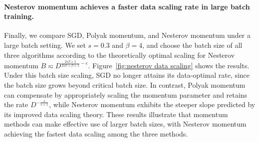 \documentclass[11pt]{article}
\begin{document}
\paragraph{Nesterov momentum achieves a faster data scaling rate in large batch training. } Finally, we compare SGD, Polyak momentum, and Nesterov momentum under a large batch setting. We set \(s=0.3\) and \(\beta=4\), and choose the batch size of all three algorithms according to the theoretically optimal scaling for Nesterov momentum \(B\eqsim D^{\frac{2s\beta+1}{2s\beta+\beta+1}-\epsilon}\). Figure~\ref{fig:nesterov data scaling} shows the results. Under this batch size scaling, SGD no longer attains its data-optimal rate, since the batch size grows beyond critical batch size. In contrast, Polyak momentum can compensate by appropriately scaling the momentum parameter and retains the rate \(D^{-\frac{s}{s+1}}\), while Nesterov momentum exhibits the steeper slope predicted by its improved data scaling theory. These results illustrate that momentum methods can make effective use of larger batch sizes, with Nesterov momentum achieving the fastest data scaling among the three methods.


\end{document}
